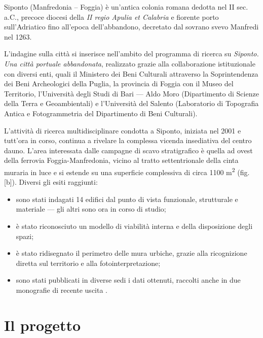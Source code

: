 \documentclass{paper}
\begin{document}
    Siponto (Manfredonia -- Foggia) è un'antica colonia romana dedotta nel II sec. a.C., precoce diocesi della \emph{II regio Apulia et Calabria} e fiorente porto sull'Adriatico fino all'epoca dell'abbandono, decretato dal sovrano svevo Manfredi nel 1263. 

    L'indagine sulla città si inserisce nell'ambito del programma di ricerca su \emph{Siponto. Una città portuale abbandonata}, realizzato grazie alla collaborazione istituzionale con diversi enti, quali il Ministero dei Beni Culturali attraverso la Soprintendenza dei Beni Archeologici della Puglia, la provincia di Foggia con il Museo del Territorio, l'Università degli Studi di Bari --- Aldo Moro (Dipartimento di Scienze della Terra e Geoambientali) e l'Università del Salento (Laboratorio di Topografia Antica e Fotogrammetria del Dipartimento di Beni Culturali). 

    L'attività di ricerca multidisciplinare condotta a Siponto, iniziata nel 2001 e tutt'ora in corso, continua a rivelare la complessa vicenda insediativa del centro dauno. L'area interessata dalle campagne di scavo stratigrafico è quella ad ovest della ferrovia Foggia-Manfredonia, vicino al tratto settentrionale della cinta muraria in luce e si estende su una superficie complessiva di circa 1100 \si{\meter\squared} (fig.[b]). Diversi gli esiti raggiunti: 
    \begin{itemize}
        \item sono stati indagati 14 edifici dal punto di vista funzionale, strutturale e materiale --- gli altri sono ora in corso di studio;
        \item è stato riconosciuto un modello di viabilità interna e della disposizione degli spazi; 
        \item è stato ridisegnato il perimetro delle mura urbiche, grazie alla ricognizione diretta sul territorio e alla fotointerpretazione;
        \item sono stati pubblicati in diverse sedi i dati ottenuti, raccolti anche in due monografie di recente uscita \cite{siponto-abbandonata-medioevo,case-cose}.
    \end{itemize}

\section{Il progetto}
\end{document}
